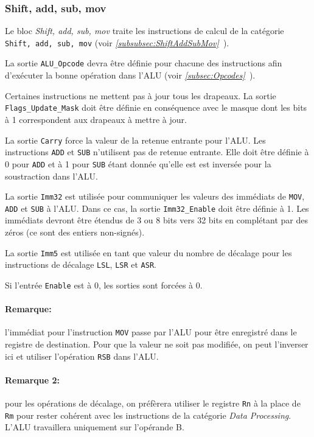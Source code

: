 \documentclass{article}
\begin{document}
    \subsubsection{Shift, add, sub, mov}
    \label{sec:SASM}

    Le bloc \textit{Shift, add, sub, mov} traite les instructions de calcul de la catégorie \texttt{Shift, add, sub, mov} (voir \textit{\ref{subsubsec:ShiftAddSubMov}~}).

    La sortie \texttt{ALU\_Opcode} devra être définie pour chacune des instructions afin d'exécuter la bonne opération dans l'ALU (voir \textit{\ref{subsec:Opcodes}~}).

    Certaines instructions ne mettent pas à jour tous les drapeaux.
    La sortie \texttt{Flags\_Update\_Mask} doit être définie en conséquence avec le masque dont les bits à 1 correspondent aux drapeaux à mettre à jour.

    La sortie \texttt{Carry} force la valeur de la retenue entrante pour l'ALU. Les instructions \texttt{ADD} et \texttt{SUB} n'utilisent pas de retenue entrante.
    Elle doit être définie à 0 pour \texttt{ADD} et à 1 pour \texttt{SUB} étant donnée qu'elle est est inversée pour la soustraction dans l'ALU.

    La sortie \texttt{Imm32} est utilisée pour communiquer les valeurs des immédiats de \texttt{MOV}, \texttt{ADD} et \texttt{SUB} à l'ALU. Dans ce cas, la sortie \texttt{Imm32\_Enable} doit être définie à 1.
    Les immédiats devront être étendus de 3 ou 8 bits vers 32 bits en complétant par des zéros (ce sont des entiers non-signés).

    La sortie \texttt{Imm5} est utilisée en tant que valeur du nombre de décalage pour les instructions de décalage \texttt{LSL}, \texttt{LSR} et \texttt{ASR}.

    Si l'entrée \texttt{Enable} est à 0, les sorties sont forcées à 0.

    \paragraph{Remarque:} l'immédiat pour l'instruction \texttt{MOV} passe par l'ALU pour être enregistré dans le registre de destination.
    Pour que la valeur ne soit pas modifiée, on peut l'inverser ici et utiliser l'opération \texttt{RSB} dans l'ALU.

    \paragraph{Remarque 2:} pour les opérations de décalage, on préfèrera utiliser le registre \texttt{Rn} à la place de \texttt{Rm} pour rester cohérent avec les instructions de la catégorie \textit{Data Processing}.
    L'ALU travaillera uniquement sur l'opérande B.
\end{document}
